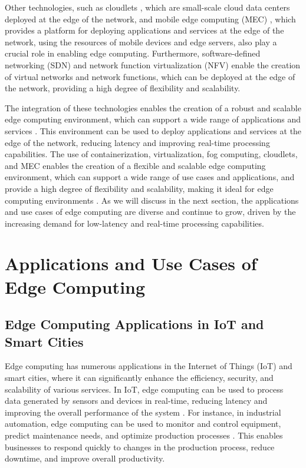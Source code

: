 \documentclass[11pt]{article}
\begin{document}
Other technologies, such as cloudlets \cite{ref32}, which are small-scale cloud data centers deployed at the edge of the network, and mobile edge computing (MEC) \cite{ref24}, which provides a platform for deploying applications and services at the edge of the network, using the resources of mobile devices and edge servers, also play a crucial role in enabling edge computing. Furthermore, software-defined networking (SDN) and network function virtualization (NFV) \cite{ref33} enable the creation of virtual networks and network functions, which can be deployed at the edge of the network, providing a high degree of flexibility and scalability.

The integration of these technologies enables the creation of a robust and scalable edge computing environment, which can support a wide range of applications and services \cite{ref34}. This environment can be used to deploy applications and services at the edge of the network, reducing latency and improving real-time processing capabilities. The use of containerization, virtualization, fog computing, cloudlets, and MEC enables the creation of a flexible and scalable edge computing environment, which can support a wide range of use cases and applications, and provide a high degree of flexibility and scalability, making it ideal for edge computing environments \cite{ref1}. As we will discuss in the next section, the applications and use cases of edge computing are diverse and continue to grow, driven by the increasing demand for low-latency and real-time processing capabilities.

\section{Applications and Use Cases of Edge Computing}

\subsection{Edge Computing Applications in IoT and Smart Cities}

Edge computing has numerous applications in the Internet of Things (IoT) and smart cities, where it can significantly enhance the efficiency, security, and scalability of various services. In IoT, edge computing can be used to process data generated by sensors and devices in real-time, reducing latency and improving the overall performance of the system \cite{ref2}. For instance, in industrial automation, edge computing can be used to monitor and control equipment, predict maintenance needs, and optimize production processes \cite{ref35}. This enables businesses to respond quickly to changes in the production process, reduce downtime, and improve overall productivity.
\end{document}
